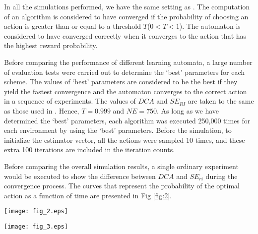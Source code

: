 In all the simulations performed, we have the same setting as \cite{papadimitriou2004new}. The computation of an algorithm is considered to have converged if the probability of choosing an action is greater than or equal to a threshold $T$($0 < T < 1$). The automaton is considered to have converged correctly when it converges to the action that has the highest reward probability.

Before comparing the performance of different learning automata, a large number of evaluation tests were carried out to determine the ‘best’ parameters for each scheme. The values of ‘best’ parameters are considered to be the best if they yield the fastest convergence and the automaton converges to the correct action in a sequence of   experiments. The values of $DCA$ and $SE_{RI}$ are taken to the same as those used in \cite{papadimitriou2004new}. Hence, $T = 0.999$ and $NE = 750$. As long as we have determined the ‘best’ parameters, each algorithm was executed 250,000 times for each environment by using the ‘best’ parameters. Before the simulation, to initialize the estimator vector, all the actions were sampled 10 times, and these extra 100 iterations are included in the iteration counts.

Before comparing the overall simulation results, a single ordinary experiment would be executed to show the difference between $DCA$ and $SE_{ri}$ during the convergence process. The curves that represent the probability of the optimal action as a function of time are presented in Fig \ref{fig:2}.

\begin{figure*}
  \texttt{[image: fig\_2.eps]}
\caption{${p_1}(t)$ versus $t$(the extra 100 iterations used to initialize the estimator vector is not included) characteristics of $DCA$ and $SE_{ri}$ when operating in environment $E_1$. For both schemes, the ‘best’ learning parameters are used.}
\label{fig:2}       %
\end{figure*}

\begin{figure*}
  \texttt{[image: fig\_3.eps]}
\caption{the percentage of the number of each action has been selected to the total number required for convergence of $DCA$ and $SE_{ri}$ in environment $E_1$ , when using the ‘best’ learning parameters(250,000 experiments were performed for each scheme).}
\label{fig:3}       %
\end{figure*}

